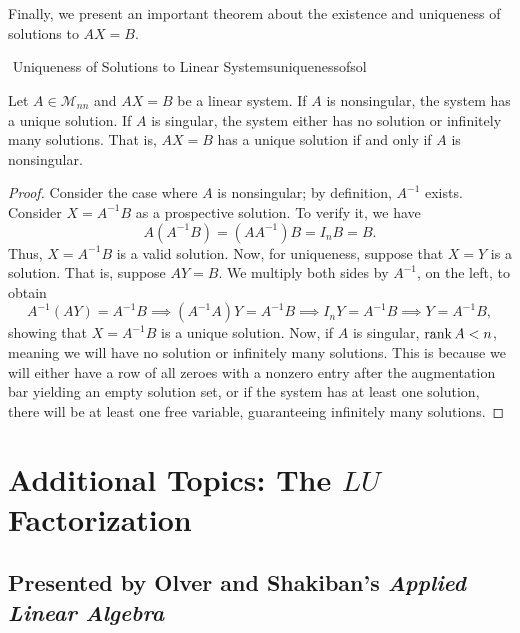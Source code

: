         \vphantom
        \\
        \\
        Finally, we present an important theorem about the existence and uniqueness of solutions to \(AX=B\).
        \begin{theorem}{\Stop\,\,Uniqueness of Solutions to Linear Systems}{uniquenessofsol}

            Let \(A\in\mathcal{M}_{nn}\) and \(AX=B\) be a linear system. If \(A\) is nonsingular, the system has a unique solution. If \(A\) is singular, the system either has no solution or infinitely many solutions. That is, \(AX=B\) has a unique solution if and only if \(A\) is nonsingular.
            \begin{proof}
                Consider the case where \(A\) is nonsingular; by definition, \(A^{-1}\) exists. Consider \(X=A^{-1}B\) as a prospective solution. To verify it, we have
                \begin{equation*}
                    A(A^{-1}B)=(AA^{-1})B=I_nB=B.
                \end{equation*}
                Thus, \(X=A^{-1}B\) is a valid solution. Now, for uniqueness, suppose that \(X=Y\) is a solution. That is, suppose \(AY=B\). We multiply both sides by \(A^{-1}\), on the left, to obtain
                \begin{equation*}
                    A^{-1}(AY)=A^{-1}B \implies (A^{-1}A)Y=A^{-1}B \implies I_nY=A^{-1}B \implies Y=A^{-1}B,
                \end{equation*}
                showing that \(X=A^{-1}B\) is a unique solution. Now, if \(A\) is singular, \(\text{rank\,} A<n\), meaning we will have no solution or infinitely many solutions. This is because we will either have a row of all zeroes with a nonzero entry after the augmentation bar yielding an empty solution set, or if the system has at least one solution, there will be at least one free variable, guaranteeing infinitely many solutions.
            \end{proof}

        \end{theorem}

\pagebreak

\section{Additional Topics: The \(LU\) Factorization}

    \subsection{Presented by Olver and Shakiban's \textit{Applied Linear Algebra}}

